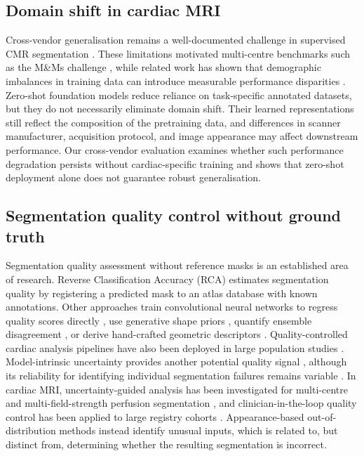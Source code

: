 \documentclass[runningheads]{llncs}
\begin{document}
\subsection{Domain shift in cardiac MRI}
Cross-vendor generalisation remains a well-documented challenge in supervised CMR segmentation \cite{tao2019multivendor,chen2020generalizability}. These limitations motivated multi-centre benchmarks such as the M\&Ms challenge \cite{campello2021mnms,martinisla2023mnm2}, while related work has shown that demographic imbalances in training data can introduce measurable performance disparities \cite{puyolanton2021fairness}. Zero-shot foundation models reduce reliance on task-specific annotated datasets, but they do not necessarily eliminate domain shift. Their learned representations still reflect the composition of the pretraining data, and differences in scanner manufacturer, acquisition protocol, and image appearance may affect downstream performance. Our cross-vendor evaluation examines whether such performance degradation persists without cardiac-specific training and shows that zero-shot deployment alone does not guarantee robust generalisation.
\vspace{-0.4cm}

\subsection{Segmentation quality control without ground truth}
Segmentation quality assessment without reference masks is an established area of research. Reverse Classification Accuracy (RCA) \cite{valindria2017rca,robinson2017qc} estimates segmentation quality by registering a predicted mask to an atlas database with known annotations. Other approaches train convolutional neural networks to regress quality scores directly \cite{robinson2019qc,tarroni2019qc,tarroni2020qc}, use generative shape priors \cite{wang2020genqc}, quantify ensemble disagreement \cite{hann2021qc}, or derive hand-crafted geometric descriptors \cite{kohlberger2012}. Quality-controlled cardiac analysis pipelines have also been deployed in large population studies \cite{ruijsink2020}. Model-intrinsic uncertainty provides another potential quality signal \cite{kendall2017uncertainties,lakshminarayanan2017ensembles,roy2019}, although its reliability for identifying individual segmentation failures remains variable \cite{jungo2019}. In cardiac MRI, uncertainty-guided analysis has been investigated for multi-centre and multi-field-strength perfusion segmentation \cite{yalcinkaya2024uncertainty}, and clinician-in-the-loop quality control has been applied to large registry cohorts \cite{yalcinkaya2024qc}. Appearance-based out-of-distribution methods \cite{hendrycks2017baseline,lee2018mahalanobis,gonzalez2022ood} instead identify unusual inputs, which is related to, but distinct from, determining whether the resulting segmentation is incorrect.
\end{document}
